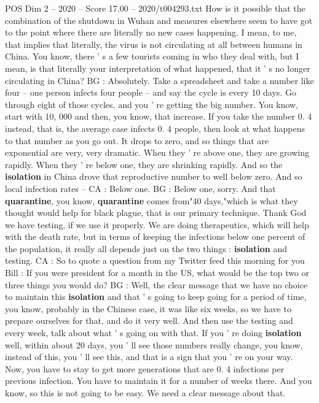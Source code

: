 \begin{textsample}{POS Dim 2 – 2020 – Score 17.00 – 2020/t004293.txt}
How is it possible that the combination of the shutdown in Wuhan and measures elsewhere seem to have got to the point where there are literally no new cases happening.
I mean, to me, that implies that literally, the virus is not circulating at all between humans in China.
You know, there ' s a few tourists coming in who they deal with, but I mean, is that literally your interpretation of what happened, that it ' s no longer circulating in China?
BG : Absolutely.
Take a spreadsheet and take a number like four -- one person infects four people -- and say the cycle is every 10 days.
Go through eight of those cycles, and you ' re getting the big number.
You know, start with 10, 000 and then, you know, that increase.
If you take the number 0. 4 instead, that is, the average case infects 0. 4 people, then look at what happens to that number as you go out.
It drops to zero, and so things that are exponential are very, very dramatic.
When they ' re above one, they are growing rapidly.
When they ' re below one, they are shrinking rapidly.
And so the \textbf{isolation} in China drove that reproductive number to well below zero.
And so local infection rates -- CA : Below one.
BG : Below one, sorry.
And that \textbf{quarantine}, you know, \textbf{quarantine} comes from"40 days,"which is what they thought would help for black plague, that is our primary technique.
Thank God we have testing, if we use it properly.
We are doing therapeutics, which will help with the death rate, but in terms of keeping the infections below one percent of the population, it really all depends just on the two things : \textbf{isolation} and testing.
CA : So to quote a question from my Twitter feed this morning for you Bill : If you were president for a month in the US, what would be the top two or three things you would do?
BG : Well, the clear message that we have no choice to maintain this \textbf{isolation} and that ' s going to keep going for a period of time, you know, probably in the Chinese case, it was like six weeks, so we have to prepare ourselves for that, and do it very well.
And then use the testing and every week, talk about what ' s going on with that.
If you ' re doing \textbf{isolation} well, within about 20 days, you ' ll see those numbers really change, you know, instead of this, you ' ll see this, and that is a sign that you ' re on your way.
Now, you have to stay to get more generations that are 0. 4 infections per previous infection.
You have to maintain it for a number of weeks there.
And you know, so this is not going to be easy.
We need a clear message about that.

\end{textsample}
